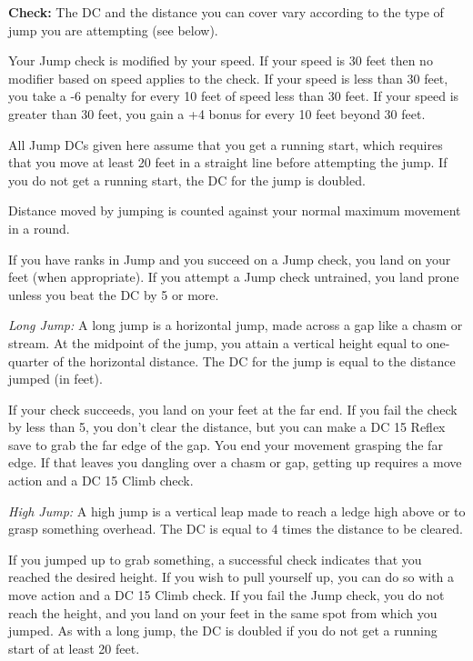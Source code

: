 
\textbf{Check:} The DC and the distance you can cover vary according to the type 
of jump you are attempting (see below).

Your Jump check is modified by your speed. If your speed is 30 feet then no modifier 
based on speed applies to the check. If your speed is less than 30 feet, you take 
a -6 penalty for every 10 feet of speed less than 30 feet. If your speed is greater 
than 30 feet, you gain a +4 bonus for every 10 feet beyond 30 feet.

All Jump DCs given here assume that you get a running start, which requires that 
you move at least 20 feet in a straight line before attempting the jump. If you 
do not get a running start, the DC for the jump is doubled.

Distance moved by jumping is counted against your normal maximum movement in a 
round.

If you have ranks in Jump and you succeed on a Jump check, you land on your feet 
(when appropriate). If you attempt a Jump check untrained, you land prone unless 
you beat the DC by 5 or more.

\textit{Long Jump:} A long jump is a horizontal jump, made across a gap like a 
chasm or stream. At the midpoint of the jump, you attain a vertical height equal 
to one-quarter of the horizontal distance. The DC for the jump is equal to the 
distance jumped (in feet).

If your check succeeds, you land on your feet at the far end. If you fail the check 
by less than 5, you don't clear the distance, but you can make a DC 15 Reflex save 
to grab the far edge of the gap. You end your movement grasping the far edge. If 
that leaves you dangling over a chasm or gap, getting up requires a move action 
and a DC 15 Climb check.

\textit{High Jump:} A high jump is a vertical leap made to reach a ledge high above 
or to grasp something overhead. The DC is equal to 4 times the distance to be cleared.

If you jumped up to grab something, a successful check indicates that you reached 
the desired height. If you wish to pull yourself up, you can do so with a move 
action and a DC 15 Climb check. If you fail the Jump check, you do not reach the 
height, and you land on your feet in the same spot from which you jumped. As with 
a long jump, the DC is doubled if you do not get a running start of at least 20 
feet.


